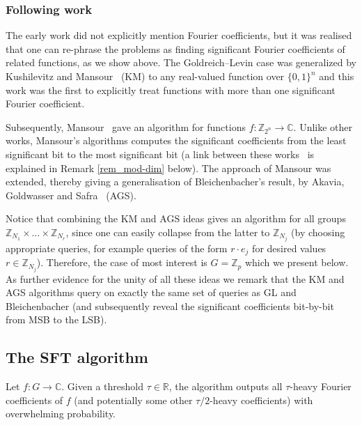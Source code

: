 \documentclass[11pt]{article}
\theoremstyle{definition}
\newcommand{\Z}{\mathbb{Z}}
\newcommand{\R}{\mathbb{R}}
\newcommand{\C}{\mathbb{C}}
\begin{document}
\subsubsection{Following work}

The early work did not explicitly mention Fourier coefficients, but it was realised that one can re-phrase the problems as finding significant Fourier coefficients of related functions, as we show above.
The Goldreich--Levin case was generalized by Kushilevitz and Mansour~\cite{KM} (KM) to any real-valued function over $\{0,1\}^n$ and this work was the first to explicitly treat functions with more than one significant Fourier coefficient.

Subsequently, Mansour~\cite{Mansour92} gave an algorithm for functions $f : \Z_{2^n} \to \C$. Unlike other works, Mansour's algorithms computes the significant coefficients from the least significant bit to the most significant bit (a link between these works~\cite{KM,Mansour92} is explained in Remark \ref{rem_mod-dim} below).
The approach of Mansour was extended, thereby giving a generalisation of Bleichenbacher's result, by Akavia, Goldwasser and Safra~\cite{AGS} (AGS).

Notice that combining the KM and AGS ideas gives an algorithm for all groups $\Z_{N_1} \times \dots \times \Z_{N_r}$, since one can easily collapse from the latter to $\Z_{N_j}$ (by choosing appropriate queries, for example queries of the form $r \cdot e_j$ for desired values $r \in \Z_{N_j}$). Therefore, the case of most interest is $G = \Z_p$ which we present below.
As further evidence for the unity of all these ideas we remark that the KM and AGS algorithms query on exactly the same set of queries as GL and Bleichenbacher (and subsequently reveal the significant coefficients bit-by-bit from MSB to the LSB).


\subsection{The SFT algorithm}\label{sec:SFTalgo}

Let $f: G \to \C$. Given a threshold $\tau \in \R$, the algorithm outputs all $\tau$-heavy Fourier coefficients of $f$ (and potentially some other $\tau/2$-heavy coefficients) with overwhelming probability.
\end{document}
